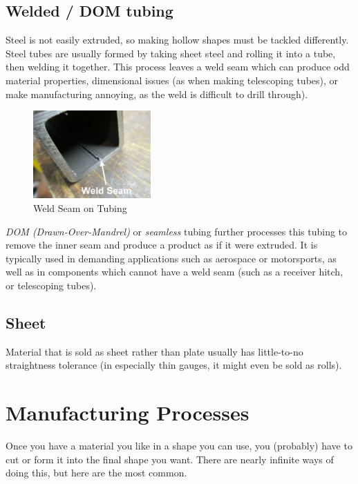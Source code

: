 \documentclass[10pt,letterpaper]{book}
\begin{document}
 \subsection{Welded / DOM tubing}
 Steel is not easily extruded, so making hollow shapes must be tackled differently. Steel tubes are usually formed by taking sheet steel and rolling it into a tube, then welding it together. This process leaves a weld seam which can produce odd material properties, dimensional issues (as when making telescoping tubes), or make manufacturing annoying, as the weld is difficult to drill through). 
 
   \begin{figure}[H]
	\centering
	\includegraphics[width=0.4\textwidth]{imgs/welded_tube_seam.png}
	
	\caption{Weld Seam on Tubing}
\end{figure}
 
 \textit{DOM (Drawn-Over-Mandrel)} or \textit{seamless} tubing further processes this tubing to remove the inner seam and produce a product as if it were extruded. It is typically used in demanding applications such as aerospace or motorsports, as well as in components which cannot have a weld seam (such as a receiver hitch, or telescoping tubes).
 
 \subsection{Sheet}
 Material that is sold as sheet rather than plate usually has little-to-no straightness tolerance (in especially thin gauges, it might even be sold as rolls).
 
 \section{Manufacturing Processes}
 
 Once you have a material you like in a shape you can use, you (probably) have to cut or form it into the final shape you want. There are nearly infinite ways of doing this, but here are the most common.
 
\end{document}
